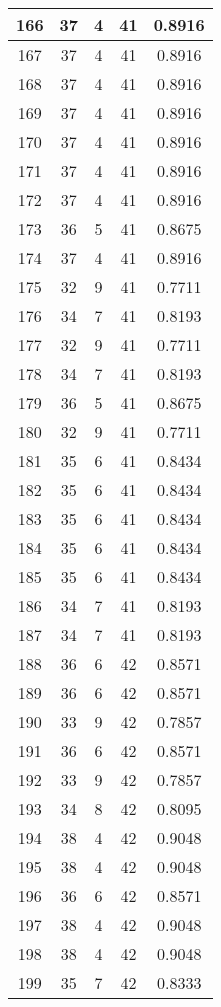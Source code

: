 \documentclass[letterpaper, 12pt]{article}
\begin{document}
\begin{longtable}{|c|c|c|c|c|}
\hline
166 & 37 & 4 & 41 & 0.8916 \\
\hline
167 & 37 & 4 & 41 & 0.8916 \\
\hline
168 & 37 & 4 & 41 & 0.8916 \\
\hline
169 & 37 & 4 & 41 & 0.8916 \\
\hline
170 & 37 & 4 & 41 & 0.8916 \\
\hline
171 & 37 & 4 & 41 & 0.8916 \\
\hline
172 & 37 & 4 & 41 & 0.8916 \\
\hline
173 & 36 & 5 & 41 & 0.8675 \\
\hline
174 & 37 & 4 & 41 & 0.8916 \\
\hline
175 & 32 & 9 & 41 & 0.7711 \\
\hline
176 & 34 & 7 & 41 & 0.8193 \\
\hline
177 & 32 & 9 & 41 & 0.7711 \\
\hline
178 & 34 & 7 & 41 & 0.8193 \\
\hline
179 & 36 & 5 & 41 & 0.8675 \\
\hline
180 & 32 & 9 & 41 & 0.7711 \\
\hline
181 & 35 & 6 & 41 & 0.8434 \\
\hline
182 & 35 & 6 & 41 & 0.8434 \\
\hline
183 & 35 & 6 & 41 & 0.8434 \\
\hline
184 & 35 & 6 & 41 & 0.8434 \\
\hline
185 & 35 & 6 & 41 & 0.8434 \\
\hline
186 & 34 & 7 & 41 & 0.8193 \\
\hline
187 & 34 & 7 & 41 & 0.8193 \\
\hline
188 & 36 & 6 & 42 & 0.8571 \\
\hline
189 & 36 & 6 & 42 & 0.8571 \\
\hline
190 & 33 & 9 & 42 & 0.7857 \\
\hline
191 & 36 & 6 & 42 & 0.8571 \\
\hline
192 & 33 & 9 & 42 & 0.7857 \\
\hline
193 & 34 & 8 & 42 & 0.8095 \\
\hline
194 & 38 & 4 & 42 & 0.9048 \\
\hline
195 & 38 & 4 & 42 & 0.9048 \\
\hline
196 & 36 & 6 & 42 & 0.8571 \\
\hline
197 & 38 & 4 & 42 & 0.9048 \\
\hline
198 & 38 & 4 & 42 & 0.9048 \\
\hline
199 & 35 & 7 & 42 & 0.8333 \\
\hline
\end{longtable}
\end{document}
